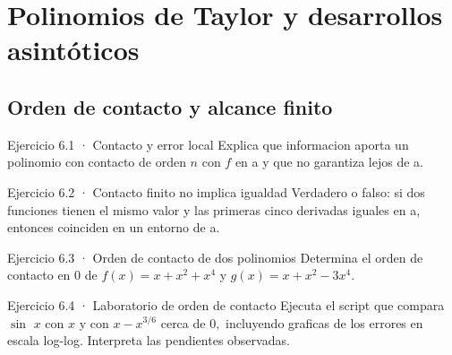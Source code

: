 \documentclass[10pt,a4paper,oneside,openany]{book}
\begin{document}
\chapter{Polinomios de Taylor y desarrollos asintóticos}
\section{Orden de contacto y alcance finito}
\begin{PSevenExerciseFixed}{Ejercicio 6.1 · Contacto y error local}
Explica que informacion aporta un polinomio con contacto de orden \(n\) con \(f\) en a y que no garantiza lejos de a.
\end{PSevenExerciseFixed}
\begin{PSevenExerciseFixed}{Ejercicio 6.2 · Contacto finito no implica igualdad}
Verdadero o falso: si dos funciones tienen el mismo valor y las primeras cinco derivadas iguales en a, entonces coinciden en un entorno de a.
\end{PSevenExerciseFixed}
\begin{PSevenExerciseFixed}{Ejercicio 6.3 · Orden de contacto de dos polinomios}
Determina el orden de contacto en \(0\) de \(f(x)=x+x^{2}+x^{4}\) y \(g(x)=x+x^{2}-3x^{4}\).
\end{PSevenExerciseFixed}
\begin{PSevenExerciseFixed}{Ejercicio 6.4 · Laboratorio de orden de contacto}
Ejecuta el script que compara \(\sin\) \(x\) con \(x\) y con \(x-x^{3/6}\) cerca de \(0,\) incluyendo graficas de los errores en escala log-log. Interpreta las pendientes observadas.
\end{PSevenExerciseFixed}
\end{document}
